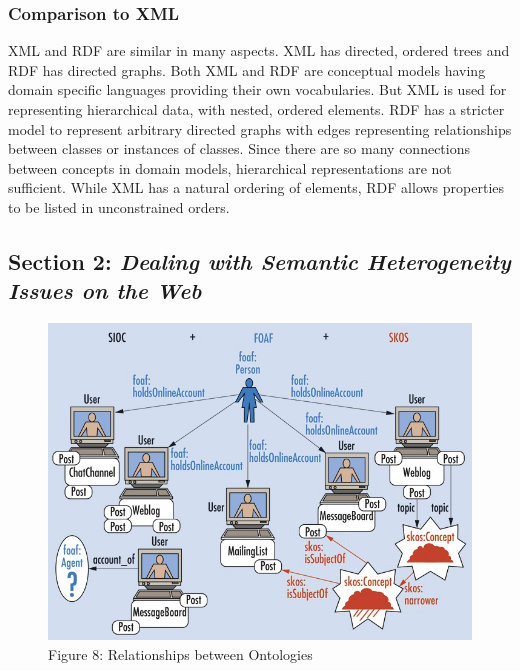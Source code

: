 \documentclass[10pt,journal,compsoc]{IEEEtran}
\begin{document}
\subsubsection{Comparison to XML}
XML and RDF are similar in many aspects.  XML has directed, ordered trees and RDF has directed graphs.  Both XML and RDF are conceptual models having domain specific languages providing their own vocabularies.  But XML is used for representing hierarchical data, with nested, ordered elements.  RDF has a stricter model to represent arbitrary directed graphs with edges representing relationships between classes or instances of classes.  Since there are so many connections between concepts in domain models, hierarchical representations are not sufficient.  While XML has a natural ordering of elements, RDF allows properties to be listed in unconstrained orders.  

\subsection{Section 2: \textit{Dealing with Semantic Heterogeneity Issues on the Web} \cite{gracia_dealing_2011}}


\begin{figure}[hbt]
\begin{center}
\includegraphics[width=6in]{Daniela1New.JPG}       
\center\caption*{Figure 8: Relationships between Ontologies \cite{6190504} }  
\label{fig1}
\end{center}
\end{figure}
\end{document}

